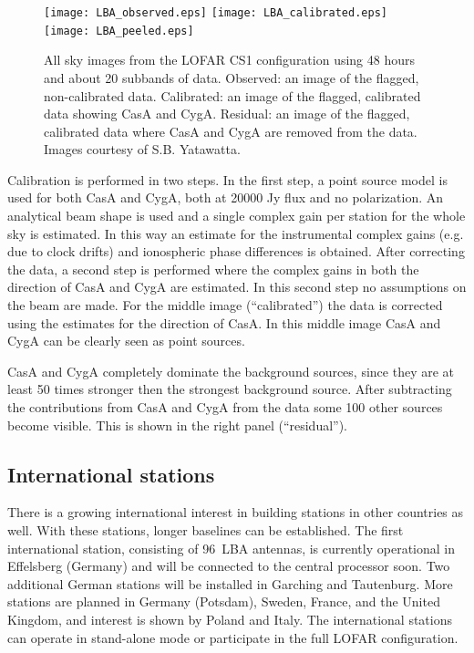 \documentclass[journal]{IEEEtran}
\begin{document}
\begin{figure}
\centering
\texttt{[image: LBA\_observed.eps]}
\texttt{[image: LBA\_calibrated.eps]}
\texttt{[image: LBA\_peeled.eps]}
\caption{All sky images from the LOFAR CS1 configuration using 48 hours and about 20 subbands of data. Observed: an image of the flagged, non-calibrated data. Calibrated: an image of the flagged, calibrated data showing CasA and CygA. Residual: an image of the flagged, calibrated data where CasA and CygA are removed from the data. Images courtesy of S.B. Yatawatta.}
\label{fig:skymap}
\end{figure}

Calibration is performed in two steps. In the first step, a point source model is used for both CasA and CygA, both at 20000 Jy flux and no polarization. An analytical beam shape is used and a single complex gain per station for the whole sky is estimated. In this way an estimate for the instrumental complex gains (e.g. due to clock drifts) and ionospheric phase differences is obtained. After correcting the data, a second step is performed where the complex gains in both the direction of CasA and CygA are estimated. In this second step no assumptions on the beam are made. For the middle image (``calibrated'') the data is corrected using the estimates for the direction of CasA. In this middle image CasA and CygA can be clearly seen as point sources. 

CasA and CygA completely dominate the background sources, since they are at least 50 times stronger then the strongest background source. After subtracting the contributions from CasA and CygA from the data some 100 other sources become visible. This is shown in the right panel (``residual''). 

\subsection{International stations}
There is a growing international interest in building stations in other
countries as well.
With these stations, longer baselines can be established.
The first international station, consisting of 96~LBA antennas, is currently
operational in Effelsberg (Germany) and will be connected to the central
processor soon.
Two additional German stations will be installed in Garching and Tautenburg.
More stations are planned in Germany (Potsdam), Sweden, France, and the
United Kingdom, and interest is shown by Poland and Italy.
The international stations can operate in stand-alone mode or participate
in the full LOFAR configuration.
\end{document}
